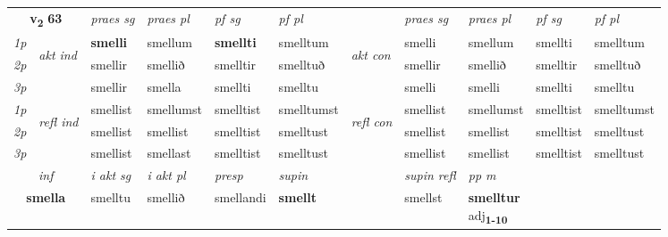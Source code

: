 \noindent
\begin{tabular}{lllllllllll} \toprule
\multicolumn{2}{c}{\textbf{v{\textsubscript{2}}} \Large{\textbf{63}}}  &  \textit{praes sg}  & \textit{praes pl}  &\textit{ pf sg} & \textit{pf pl} &  &  \textit{praes sg}  & \textit{praes pl}  & \textit{pf sg} & \textit{pf pl } \\*
	\cmidrule{3-6} \cmidrule{8-11}
 {\textit{1p}} & \multirow{3}{*}{\begin{turn}{90}\textit{akt ind}\end{turn}} & \textbf{smelli} & smellum & \textbf{smellti} & smelltum & \multirow{3}{*}{\begin{turn}{90}\textit{akt con}\end{turn}} &smelli & smellum & smellti & smelltum\\*
 {\textit{2p}} &  &  smellir  & smellið & smelltir & smelltuð & & smellir & smellið & smelltir & smelltuð \\*
{\textit{3p}} &  & smellir & smella & smellti & smelltu & & smelli & smelli& smellti & smelltu \\*
\cmidrule{3-6} \cmidrule{8-11}
 {\textit{1p}} & \multirow{3}{*}{\begin{turn}{90}\textit{refl ind}\end{turn}}  & smellist & smellumst & smelltist & smelltumst & \multirow{3}{*}{\begin{turn}{90}\textit{refl con}\end{turn}}  &smellist & smellumst & smelltist & smelltumst \\*
 {\textit{2p}} &  & smellist & smellist & smelltist & smelltust & &smellist & smellist & smelltist & smelltust \\*
 {\textit{3p}}  & & smellist & smellast & smelltist & smelltust & & smellist & smellist& smelltist & smelltust \\*
\cmidrule{3-6} \cmidrule{8-11}

   \multicolumn{2}{c}{\textit{inf}}  & \textit{i akt sg} & \textit{i akt pl}   & \textit{presp} & \textit{supin} && \textit{supin refl} & \textit{pp m} \\*
  \multicolumn{2}{c}{\textbf{smella}} & smelltu  & smellið   & smellandi &  \textbf{smellt} && smellst & \specialcell{\textbf{smelltur} \\ adj\textbf{\textsubscript{1-10}}} \\*
\end{tabular}

